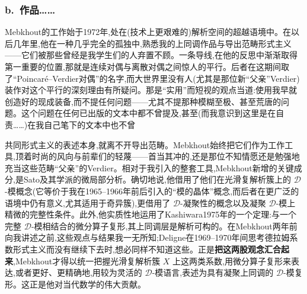 \subsubsection*{b.~作品……}



Mebkhout的工作始于1972年,处在(技术上更艰难的)解析空间的超越语境中。在以后几年里,他在一种几乎完全的孤独中,熟悉我的上同调作品与导出范畴形式主义——它们被那些曾经是我学生们的人弃置不顾。\dmark{}一条导线,在他的反思中渐渐取得第一重要的位置,那就是连续对偶与离散对偶之间惊人的平行。后者在这期间取了“Poincaré--Verdier对偶”的名字,而大世界里没有人(尤其是那位新“父亲”Verdier)装作对这个平行的深刻理由有所疑问。那是“实用”而短视的观点当道:使用我早就创造好的现成装备,而不提任何问题——尤其不提那种模糊至极、甚至荒唐的问题。这个问题在任何已出版的文本中都不曾提及,甚至(而我意识到这里是在自责……)在我自己笔下的文本中也不曾

共同形式主义的表述本身,就离不开导出范畴。Mebkhout始终把它们作为工作工具,顶着时尚的风向与前辈们的轻蔑——首当其冲的,还是那位不知情愿还是勉强地充当这些范畴“父亲”的Verdier。相对于我引入的整套工具,Mebkhout新增的关键成分,是Sato及其学派的微局部分析。确切地说,他借用了他们在光滑复解析簇上的 $\mathcal{D}$-模概念(它等价于我在1965--1966年前后引入的“模的晶体”概念,而后者在更广泛的语境中仍有意义,尤其适用于奇异簇),更借用了 $\mathcal{D}$-凝聚性的概念以及凝聚 $\mathcal{D}$-模上精微的完整性条件。此外,他实质性地运用了Kashiwara1975年的一个定理:与一个\dmark{}完整 $\mathcal{D}$-模相结合的微分算子复形,其上同调层是解析可构的。在Mebkhout两年前向我讲述之前,这些观点与结果我一无所知;Deligne在1969--1970年间思考德拉姆系数形式主义而没有继续下去时,想必同样不知道这些。正是\textbf{把这两股观念汇合起来},Mebkhout才得以统一把握光滑复解析簇 $X$ 上这两类系数,用微分算子复形来表达,或者更好、更精确地,用较为灵活的 $\mathcal{D}$-模语言,表述为具有凝聚上同调的 $\mathcal{D}$-模复形。这正是他对当代数学的伟大贡献。

